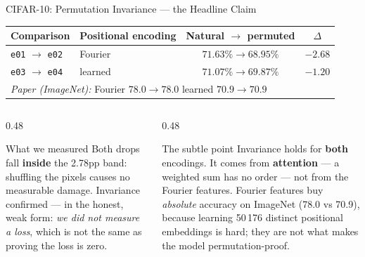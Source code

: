 \documentclass[aspectratio=169,11pt]{beamer}
\begin{document}
\begin{frame}[shrink=5]{CIFAR-10: Permutation Invariance --- the Headline Claim}
  \begin{table}
    \centering\small
    \begin{tabular}{llcc}
      \toprule
      \textbf{Comparison} & \textbf{Positional encoding} & \textbf{Natural $\to$ permuted} & \textbf{$\Delta$} \\
      \midrule
      \texttt{e01} $\to$ \texttt{e02} & Fourier & $71.63\% \to 68.95\%$ & $-2.68$ \\
      \texttt{e03} $\to$ \texttt{e04} & learned & $71.07\% \to 69.87\%$ & $-1.20$ \\
      \midrule
      \multicolumn{4}{l}{\textit{Paper (ImageNet):} Fourier $78.0 \to 78.0$ \quad learned $70.9 \to 70.9$} \\
      \bottomrule
    \end{tabular}
  \end{table}

  \vspace{0.4em}
  \begin{columns}[T]
    \begin{column}{0.48\textwidth}
      \begin{block}{What we measured}
        \small
        Both drops fall \textbf{inside} the 2.78pp band: shuffling the pixels causes no measurable damage. Invariance confirmed --- in the honest, weak form: \emph{we did not measure a loss}, which is not the same as proving the loss is zero.
      \end{block}
    \end{column}
    \begin{column}{0.48\textwidth}
      \begin{block}{The subtle point}
        \small
        Invariance holds for \textbf{both} encodings. It comes from \textbf{attention} --- a weighted sum has no order --- not from the Fourier features. Fourier features buy \emph{absolute} accuracy on ImageNet (78.0 vs 70.9), because learning 50\,176 distinct positional embeddings is hard; they are not what makes the model permutation-proof.
      \end{block}
    \end{column}
  \end{columns}
\end{frame}
\end{document}
